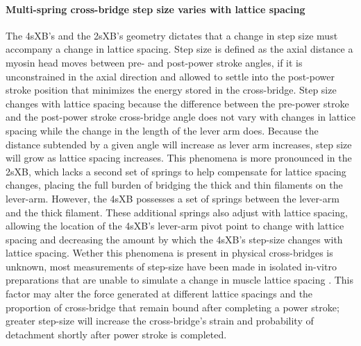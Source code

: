 \documentclass[]{article}
\begin{document}
\paragraph{Multi-spring cross-bridge step size varies with lattice spacing} %
The 4sXB's and the 2sXB's geometry dictates that a change in step size must accompany a change in lattice spacing. 
Step size is defined as the axial distance a myosin head moves between pre- and post-power stroke angles, if it is unconstrained in the axial direction and allowed to settle into the post-power stroke position that minimizes the energy stored in the cross-bridge.
Step size changes with lattice spacing because the difference between the pre-power stroke and the post-power stroke cross-bridge angle does not vary with changes in lattice spacing while the change in the length of the lever arm does. 
Because the distance subtended by a given angle will increase as lever arm increases, step size will grow as lattice spacing increases. 
This phenomena is more pronounced in the 2sXB, which lacks a second set of springs to help compensate for lattice spacing changes, placing the full burden of bridging the thick and thin filaments on the lever-arm. 
However, the 4sXB possesses a set of springs between the lever-arm and the thick filament.
These additional springs also adjust with lattice spacing, allowing the location of the 4sXB's lever-arm pivot point to change with lattice spacing and decreasing the amount by which the 4sXB's step-size changes with lattice spacing.  
Wether this phenomena is present in physical cross-bridges is unknown, most measurements of step-size have been made in isolated in-vitro preparations that are unable to simulate a change in muscle lattice spacing \citep{HowardBook, Peterman2004}.  
This factor may alter the force generated at different lattice spacings and the proportion of cross-bridge that remain bound after completing a power stroke; greater step-size will increase the cross-bridge's strain and probability of detachment shortly after power stroke is completed. 
\end{document}
